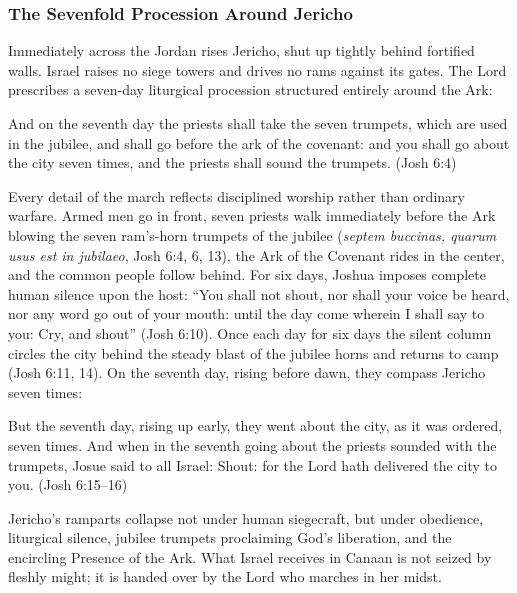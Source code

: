 \subsubsection{The Sevenfold Procession Around Jericho}

Immediately across the Jordan rises Jericho, shut up tightly behind fortified walls. Israel raises no siege towers and drives no rams against its gates. The Lord prescribes a seven-day liturgical procession structured entirely around the Ark:

\begin{scriptureblock}
And on the seventh day the priests shall take the seven trumpets, which are used in the jubilee, and shall go before the ark of the covenant: and you shall go about the city seven times, and the priests shall sound the trumpets. \textnormal{(Josh 6:4)}
\end{scriptureblock}

Every detail of the march reflects disciplined worship rather than ordinary warfare. Armed men go in front, seven priests walk immediately before the Ark blowing the seven ram's-horn trumpets of the jubilee (\textit{septem buccinas, quarum usus est in jubilaeo}, Josh 6:4, 6, 13), the Ark of the Covenant rides in the center, and the common people follow behind. For six days, Joshua imposes complete human silence upon the host: ``You shall not shout, nor shall your voice be heard, nor any word go out of your mouth: until the day come wherein I shall say to you: Cry, and shout'' (Josh 6:10). Once each day for six days the silent column circles the city behind the steady blast of the jubilee horns and returns to camp (Josh 6:11, 14). On the seventh day, rising before dawn, they compass Jericho seven times:

\begin{scriptureblock}
But the seventh day, rising up early, they went about the city, as it was ordered, seven times. And when in the seventh going about the priests sounded with the trumpets, Josue said to all Israel: Shout: for the Lord hath delivered the city to you. \textnormal{(Josh 6:15--16)}
\end{scriptureblock}

Jericho's ramparts collapse not under human siegecraft, but under obedience, liturgical silence, jubilee trumpets proclaiming God's liberation, and the encircling Presence of the Ark. What Israel receives in Canaan is not seized by fleshly might; it is handed over by the Lord who marches in her midst.

